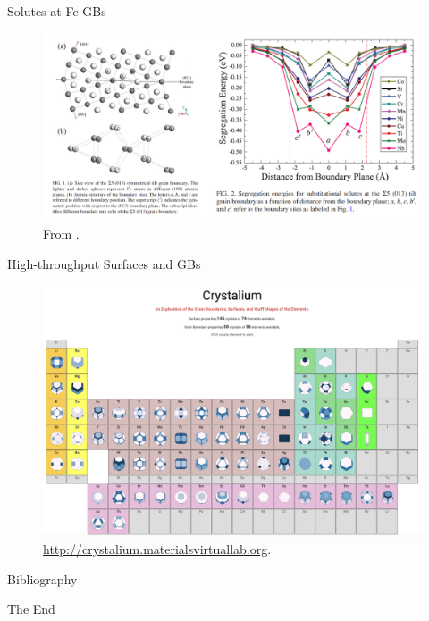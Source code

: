 \documentclass[aspectratio=169]{beamer}
\begin{document}
    \begin{frame}{Solutes at Fe GBs}
        \begin{figure}
            \centering
            \includegraphics[width=0.8\linewidth]{lectures/figures/11_Solutes_at_Fe_GBs.png}
            \caption{From \cite{jinStudyInteractionSolutes2014}.}
        \end{figure}
    \end{frame}


    \begin{frame}{High-throughput Surfaces and GBs}
        \begin{figure}
            \centering
            \includegraphics[width=0.5\linewidth]{lectures/figures/11_Crystalium.png}
            \caption{\url{http://crystalium.materialsvirtuallab.org}.\cite{tranSurfaceEnergiesElemental2016,tranAnisotropicWorkFunction2019,zhengGrainBoundaryProperties2020}}
        \end{figure}
    \end{frame}

    \begin{frame}[allowframebreaks]{Bibliography}
        
        
    \end{frame}



    \begin{frame}
        \Huge{\centerline{The End}}
    \end{frame}
\end{document}
